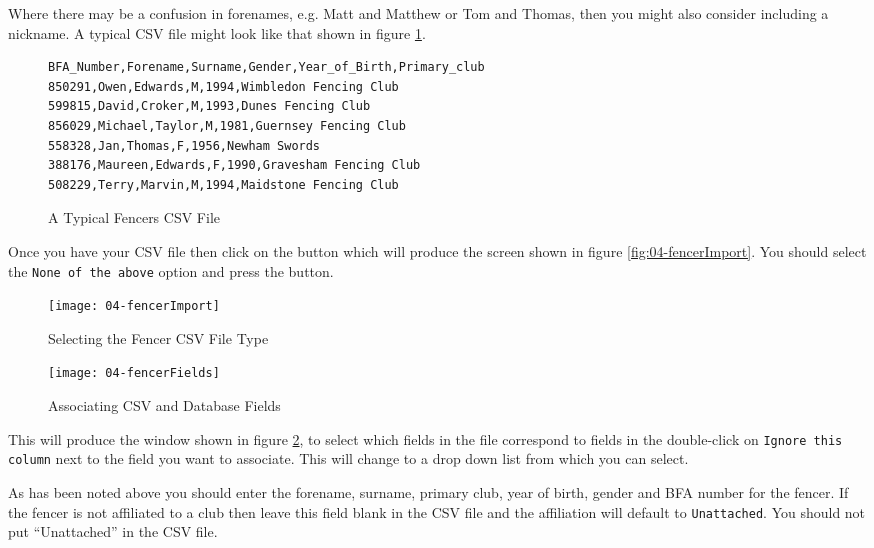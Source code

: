 \documentclass[a4paper,11pt]{memoir}
\begin{document}
Where there may be a confusion in forenames, e.g. Matt and Matthew or Tom and Thomas, then you might also consider including a nickname. 
A typical CSV file might look like that shown in figure \ref{fig:04-fencersCSV}.

\begin{figure}[!ht]
 \begin{verbatim}
BFA_Number,Forename,Surname,Gender,Year_of_Birth,Primary_club
850291,Owen,Edwards,M,1994,Wimbledon Fencing Club
599815,David,Croker,M,1993,Dunes Fencing Club
856029,Michael,Taylor,M,1981,Guernsey Fencing Club
558328,Jan,Thomas,F,1956,Newham Swords
388176,Maureen,Edwards,F,1990,Gravesham Fencing Club
508229,Terry,Marvin,M,1994,Maidstone Fencing Club
 \end{verbatim}
 \caption{A Typical Fencers CSV File} \label{fig:04-fencersCSV}
\end{figure}

Once you have your CSV file then click on the  button which will produce the screen shown in figure \ref{fig:04-fencerImport}. You should select the \texttt{None of the above} option and press the  button.

\begin{figure}[!ht]
 \centering 
 \begin{minipage}{0.4\textwidth}
  \centering
  \texttt{[image: 04-fencerImport]}
  \caption{Selecting the Fencer CSV File Type} \label{fig:04-fencerImport}
 \end{minipage}
 \hfill
 \begin{minipage}{0.4\textwidth}
  \centering
  \texttt{[image: 04-fencerFields]}
  \caption{Associating CSV and Database Fields} \label{fig:04-fencerFields}
 \end{minipage}
\end{figure}

This will produce the window shown in figure \ref{fig:04-fencerFields}, to select which fields in the file correspond to fields in the \fencingtime{}  double-click on \texttt{Ignore this column} next to the field you want to associate. This will change to a drop down list from which you can select.  

As has been noted above you should enter the forename, surname, primary club, year of birth, gender and BFA number for the fencer. If the fencer is not affiliated to a club then leave this field blank in the CSV file and the affiliation will default to \texttt{Unattached}.  You should not put ``Unattached'' in the CSV file. 
\end{document}
